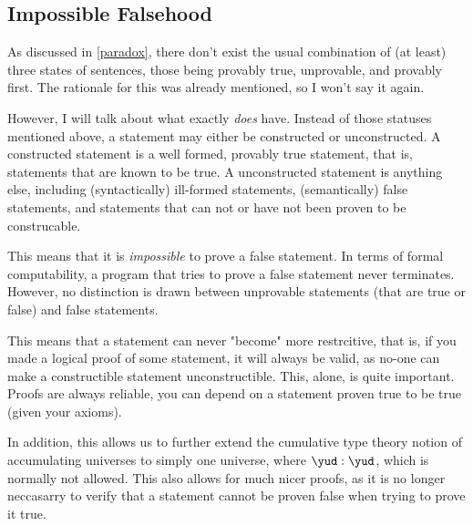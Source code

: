 \subsection{Impossible Falsehood}

As discussed in \ref{paradox}, there don't exist the usual combination of (at least) three states of sentences, those being provably true, unprovable, and provably first.
The rationale for this was already mentioned, so I won't say it again.

However, I will talk about what exactly \this \emph{does} have.
Instead of those statuses mentioned above, a statement may either be constructed or unconstructed.
A constructed statement is a well formed, provably true statement, that is, statements that are known to be true.
A unconstructed statement is anything else, including (syntactically) ill-formed statements, (semantically) false statements, and statements that can not or have not been proven to be construcable.

This means that it is \emph{impossible} to prove a false statement.
In terms of formal computability, a program that tries to prove a false statement never terminates.
However, no distinction is drawn between unprovable statements (that are true or false) and false statements.

This means that a statement can never "become" more restrcitive, that is, if you made a logical proof of some statement, it will always be valid, as no-one can make a constructible statement unconstructible.
This, alone, is quite important.
Proofs are always reliable, you can depend on a statement proven true to be true (given your axioms).

In addition, this allows us to further extend the cumulative type theory notion of accumulating universes to simply one universe, where $\yud : \yud$, which is normally not allowed.
This also allows for much nicer proofs, as it is no longer neccasarry to verify that a statement cannot be proven false when trying to prove it true.